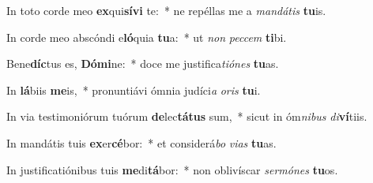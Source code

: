 \item In toto corde meo \textbf{ex}qui\textbf{sí}\textbf{vi} te:~* ne repéllas me a \textit{man}\textit{dá}\textit{tis} \textbf{tu}is.
\item In corde meo abscóndi e\textbf{ló}quia \textbf{tu}a:~* ut \textit{non} \textit{pec}\textit{cem} \textbf{ti}bi.
\item Bene\textbf{díc}tus es, \textbf{Dó}\textbf{mi}ne:~* doce me justifica\textit{ti}\textit{ó}\textit{nes} \textbf{tu}as.
\item In \textbf{lá}biis \textbf{me}is,~* pronuntiávi ómnia judíci\textit{a} \textit{o}\textit{ris} \textbf{tu}i.
\item In via testimoniórum tuórum \textbf{de}lec\textbf{tá}\textbf{tus} sum,~* sicut in óm\textit{ni}\textit{bus} \textit{di}\textbf{ví}tiis.
\item In mandátis tuis \textbf{ex}er\textbf{cé}bor:~* et considerá\textit{bo} \textit{vi}\textit{as} \textbf{tu}as.
\item In justificatiónibus tuis \textbf{me}di\textbf{tá}bor:~* non oblivíscar \textit{ser}\textit{mó}\textit{nes} \textbf{tu}os.
